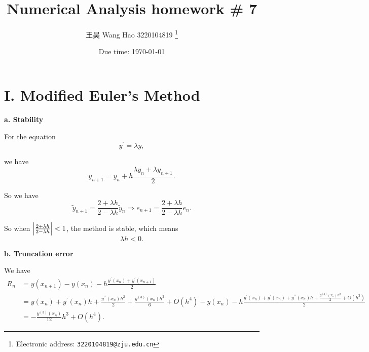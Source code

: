 \documentclass[a4paper]{article}
\begin{document}
\title{Numerical Analysis homework \# 7}

\author{王昊 Wang Hao 3220104819
  \thanks{Electronic address: \texttt{3220104819@zju.edu.cn}}}


\date{Due time: \today}

\maketitle

\section*{I. Modified Euler's Method}

\textbf{a. Stability}

For the equation 
\begin{equation}
    y^{\prime} = \lambda y, 
\end{equation}

we have
\begin{equation}
    y_{n+1} = y_n + h \frac{\lambda y_n + \lambda y_{n+1}}{2}.
\end{equation}

So we have
\begin{equation}
    \tilde{y}_{n+1} = \frac{2 + \lambda h}{2 - \lambda h} \tilde{y}_n \Rightarrow e_{n+1} = \frac{2 + \lambda h}{2 - \lambda h} e_n.
\end{equation}

So when $\abs{\frac{2 + \lambda h}{2 - \lambda h}} < 1$, the method is stable, which means 
\begin{equation}
    \lambda h < 0.
\end{equation}

\textbf{b. Truncation error}

We have 
\begin{equation}
    \begin{aligned}
        R_n &= y(x_{n+1}) - y(x_n) - h \frac{y^{\prime} (x_n) + y^{\prime}(x_{n+1})}{2} \\
        &= y(x_n) + y^{\prime} (x_n) h + \frac{y^{\prime \prime} (x_n) h^2}{2} + \frac{y^{(3)}(x_n) h^3}{6} + O(h^4) - y(x_n) - h\frac{y^{\prime}(x_n) + y^{\prime}(x_n) + y^{\prime \prime}(x_n) h + \frac{y^{(3)}(x_n) h^2}{2} + O(h^3)}{2} \\
        &= - \frac{y^{(3)}(x_n)}{12} h^3 + O(h^4).
    \end{aligned}
\end{equation}
\end{document}
